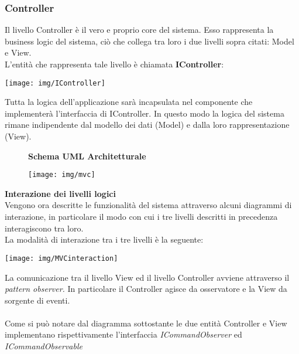 \documentclass{article}
\begin{document}
  \subsubsection{Controller}
  Il livello Controller è il vero e proprio core del sistema. Esso rappresenta la business logic del sistema, ciò che collega tra loro i due livelli
  sopra citati: Model e View.\\
  L'entità che rappresenta tale livello è chiamata \textbf{IController}:
  \begin{center}
    \texttt{[image: img/IController]}
  \end{center}
  Tutta la logica dell'applicazione sarà incapsulata nel componente che implementerà l'interfaccia di IController. In questo modo la logica del sistema
  rimane indipendente dal modello dei dati (Model) e dalla loro rappresentazione (View).
  \begin{figure}[H]
    \centering
    \begin{framed}
      \textbf{Schema UML Architetturale}\par\medskip
      \texttt{[image: img/mvc]}
    \end{framed}
  \end{figure}
  {\large \textbf{Interazione dei livelli logici}}
  \\[0.3in]Vengono ora descritte le funzionalità del sistema attraverso alcuni diagrammi di interazione, in particolare il modo con cui i tre livelli descritti
  in precedenza interagiscono tra loro.\\
  La modalità di interazione tra i tre livelli è la seguente:
  \begin{center}
    \texttt{[image: img/MVCinteraction]}
  \end{center}
  La comunicazione tra il livello View ed il livello Controller avviene attraverso il \textit{pattern observer.} In particolare il Controller agisce
  da osservatore e la View da sorgente di eventi.\\
  \\Come si può notare dal diagramma sottostante le due entità Controller e View implementano rispettivamente l'interfaccia \textit{ICommandObserver} ed \textit{ICommandObservable}
\end{document}
